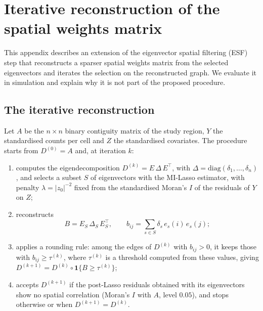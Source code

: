 %
%     

\section{Iterative reconstruction of the spatial weights matrix}
\label{app:reconstruction}

This appendix describes an extension of the eigenvector spatial filtering (ESF) step that reconstructs a sparser spatial weights matrix from the selected eigenvectors and iterates the selection on the reconstructed graph. We evaluate it in simulation and explain why it is not part of the proposed procedure.

\subsection{The iterative reconstruction}
\label{app:rec-procedure}

Let $A$ be the $n\times n$ binary contiguity matrix of the study region, $Y$ the standardised counts per cell and $Z$ the standardised covariates. The procedure starts from $D^{(0)}=A$ and, at iteration $k$:

\begin{enumerate}
  \item computes the eigendecomposition $D^{(k)} = E\,\Delta\,E^\top$, with $\Delta=\mathrm{diag}(\delta_1,\dots,\delta_n)$, and selects a subset $S$ of eigenvectors with the MI-Lasso estimator, with penalty $\lambda=|z_0|^{-2}$ fixed from the standardised Moran's $I$ of the residuals of $Y$ on $Z$;
  \item reconstructs
  \begin{equation}
    B = E_S\,\Delta_S\,E_S^\top, \qquad b_{ij} = \sum_{s\in S}\delta_s\, e_s(i)\, e_s(j);
    \label{eq:app-B}
  \end{equation}
  \item applies a rounding rule: among the edges of $D^{(k)}$ with $b_{ij}>0$, it keeps those with $b_{ij}\ge\tau^{(k)}$, where $\tau^{(k)}$ is a threshold computed from these values, giving $D^{(k+1)} = D^{(k)}\circ\mathbf{1}\{B\ge\tau^{(k)}\}$;
  \item accepts $D^{(k+1)}$ if the post-Lasso residuals obtained with its eigenvectors show no spatial correlation (Moran's $I$ with $A$, level $0.05$), and stops otherwise or when $D^{(k+1)}=D^{(k)}$.
\end{enumerate}

